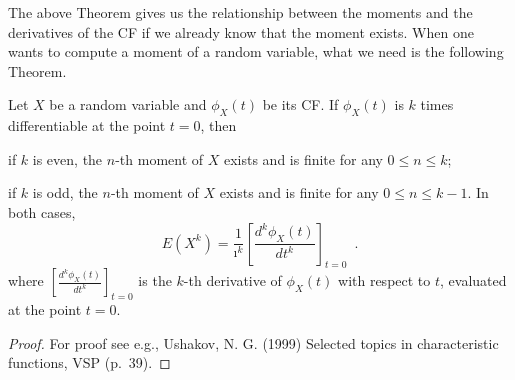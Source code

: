 The above Theorem gives us the relationship between the moments and the derivatives of the CF if we already know that the moment exists.  
When one wants to compute a moment of a random variable, what we need is the following Theorem.

\begin{framed}
\begin{prop}
Let $X$ be a random variable and $\phi_X(t)$ be its CF.  
If $\phi_X(t)$ is $k$ times differentiable at the point $t=0$, then
\be
\item if $k$ is even, the $n$-th moment of $X$ exists and is finite for any $0 \leq n \leq k$;
\item if $k$ is odd, the $n$-th moment of $X$ exists and is finite for any $0 \leq n \leq k-1$.
\ee
In both cases,
\begin{equation}\label{E:CFToMoments}
E(X^k) = \frac{1}{\imath^k} \left[\frac{d^k \phi_X(t)}{dt^k}\right]_{t=0} \enspace .
\end{equation}
where $\left[\frac{d^k \phi_X(t)}{dt^k}\right]_{t=0}$ is the $k$-th derivative of $\phi_X(t)$ with respect to $t$, evaluated at the point $t=0$.
\end{prop}
\end{framed}

\begin{proof}
For proof see e.g., Ushakov, N. G. (1999) Selected topics in characteristic functions, VSP (p.~39).
\end{proof}


